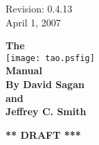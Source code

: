 \thispagestyle{empty}

\begin{flushright}
\large
  Revision: 0.4.13 \\
  April 1, 2007 \\
\end{flushright}

\vfill

{
\begin{center}
{\Huge \sf\bf The} \\
\vskip 0.1in
\texttt{[image: tao.psfig]} \\
\vskip 0.1in
{\Huge \sf\bf Manual} \\
\vskip 0.4in
{\Large \sf\bf By David Sagan \\ and \\ Jeffrey C. Smith} \\
\end{center}
}

\vskip 1in
\begin{center}
{\Huge \bf *** DRAFT ***}
\end{center}
\vfill
\break
